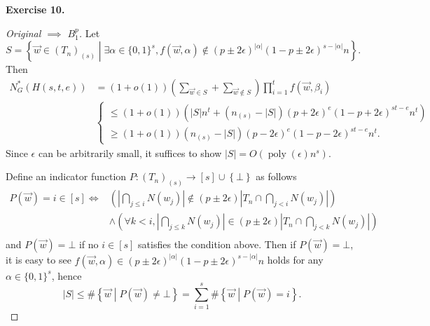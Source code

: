 \documentclass[a4paper]{article}
\newtheorem*{proof}{Proof}
\newenvironment{exercise}[1]{
	\par
	\noindent\textbf{Exercise #1.}\quad
}{
	\par
	\bigskip
}
\DeclareMathOperator{\poly}{\mathrm{poly}}
\newcommand{\abs}[1]{\left| #1 \right|}
\newcommand{\pbra}[1]{\left( #1 \right)}
\newcommand{\cbra}[1]{\left\{ #1 \right\}}
\newcommand{\bin}{\{0,1\}}
\begin{document}
\begin{exercise}{10}
\begin{proof}[Original $\implies$ $B_1^p$]
        Let 
        $$
        S=\cbra{\vec w\in (T_n)_{(s)}\middle|\exists\alpha\in\bin^s,
        f(\vec w,\alpha)\notin(p\pm2\epsilon)^{|\alpha|}(1-p\pm2\epsilon)^{s-|\alpha|}n}.
        $$
        Then
        \begin{align*}
            N_G^*(H(s,t,e))
            &=(1+o(1))\pbra{\sum_{\vec w\in S}+\sum_{\vec w\notin S}}\prod_{i=1}^tf(\vec w,\beta_i)\\
            &\begin{cases}
                \leq(1+o(1))\pbra{|S|n^t+(n_{(s)}-|S|)(p+2\epsilon)^e(1-p+2\epsilon)^{st-e}n^t}\\
                \geq(1+o(1))\pbra{n_{(s)}-|S|}(p-2\epsilon)^e(1-p-2\epsilon)^{st-e}n^t.
            \end{cases}
        \end{align*}
        Since $\epsilon$ can be arbitrarily small, it suffices to show $|S|=O(\poly(\epsilon)n^s)$.

        Define an indicator function $P:\pbra{T_n}_{(s)}\to[s]\cup\cbra{\bot}$ as follows
        \begin{align*}
        P(\vec w)=i\in[s]\iff
            &\pbra{\abs{\bigcap_{j\leq i}N(w_j)}\notin(p\pm2\epsilon)\abs{T_n\cap\bigcap_{j<i}N(w_j)}}\\
        &\land
            \pbra{\forall k<i,\abs{\bigcap_{j\leq k}N(w_j)}\in(p\pm2\epsilon)\abs{T_n\cap\bigcap_{j<k}N(w_j)}}\\
        \end{align*}
        and $P(\vec w)=\bot$ if no $i\in[s]$ satisfies the condition above.
        Then if $P(\vec w)=\bot$, it is easy to see 
        $f(\vec w,\alpha)\in(p\pm2\epsilon)^{|\alpha|}(1-p\pm2\epsilon)^{s-|\alpha|}n$ holds for any $\alpha\in\bin^s$,
        hence 
        $$
        |S|\leq\#\cbra{\vec w\middle|P(\vec w)\neq\bot}=\sum_{i=1}^s\#\cbra{\vec w\middle|P(\vec w)=i}.
        $$


\end{proof}
\end{exercise}
\end{document}

